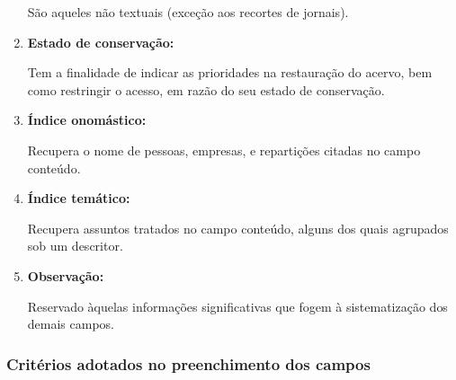 \begin{enumerate}
	São aqueles não textuais (exceção aos recortes de jornais).
	\item \textbf{Estado de conservação:}
	
	Tem a finalidade de indicar as prioridades na restauração do acervo, bem como restringir o acesso, em razão do seu estado de conservação.
	\item \textbf{Índice onomástico:}
	
	Recupera o nome de pessoas, empresas, e repartições citadas no campo conteúdo.
	\item \textbf{Índice temático:}
	
	Recupera assuntos tratados no campo conteúdo, alguns dos quais agrupados sob um descritor.
	\item \textbf{Observação:}
	
	Reservado àquelas informações significativas que fogem à sistematização dos demais campos.
\end{enumerate}

\subsubsection{Critérios adotados no preenchimento dos campos}

